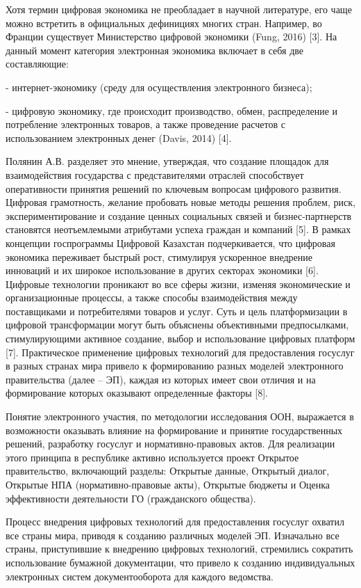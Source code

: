 \begin{multicols}{2}
Хотя термин цифровая экономика не преобладает в научной литературе, его
чаще можно встретить в официальных дефинициях многих стран. Например, во
Франции существует Министерство цифровой экономики (Fung, 2016) {[}3{]}.
На данный момент категория электронная экономика включает в себя две
составляющие:

- интернет-экономику (среду для осуществления электронного бизнеса);

- цифровую экономику, где происходит производство, обмен, распределение
и потребление электронных товаров, а также проведение расчетов с
использованием электронных денег (Davis, 2014) {[}4{]}.

Полянин А.В. разделяет это мнение, утверждая, что создание площадок для
взаимодействия государства с представителями отраслей способствует
оперативности принятия решений по ключевым вопросам цифрового развития.
Цифровая грамотность, желание пробовать новые методы решения проблем,
риск, экспериментирование и создание ценных социальных связей и
бизнес-партнерств становятся неотъемлемыми атрибутами успеха граждан и
компаний {[}5{]}. В рамках концепции госпрограммы Цифровой Казахстан
подчеркивается, что цифровая экономика переживает быстрый рост,
стимулируя ускоренное внедрение инноваций и их широкое использование в
других секторах экономики {[}6{]}. Цифровые технологии проникают во все
сферы жизни, изменяя экономические и организационные процессы, а также
способы взаимодействия между поставщиками и потребителями товаров и
услуг. Суть и цель платформизации в цифровой трансформации могут быть
объяснены объективными предпосылками, стимулирующими активное создание,
выбор и использование цифровых платформ {[}7{]}. Практическое применение
цифровых технологий для предоставления госуслуг в разных странах мира
привело к формированию разных моделей электронного правительства (далее
-- ЭП), каждая из которых имеет свои отличия и на формирование которых
оказывают определенные факторы {[}8{]}.

Понятие электронного участия, по методологии исследования ООН,
выражается в возможности оказывать влияние на формирование и принятие
государственных решений, разработку госуслуг и нормативно-правовых
актов. Для реализации этого принципа в республике активно используется
проект Открытое правительство, включающий разделы: Открытые данные,
Открытый диалог, Открытые НПА (нормативно-правовые акты), Открытые
бюджеты и Оценка эффективности деятельности ГО (гражданского общества).

Процесс внедрения цифровых технологий для предоставления госуслуг
охватил все страны мира, приводя к созданию различных моделей ЭП.
Изначально все страны, приступившие к внедрению цифровых технологий,
стремились сократить использование бумажной документации, что привело к
созданию индивидуальных электронных систем документооборота для каждого
ведомства.


\end{multicols}
